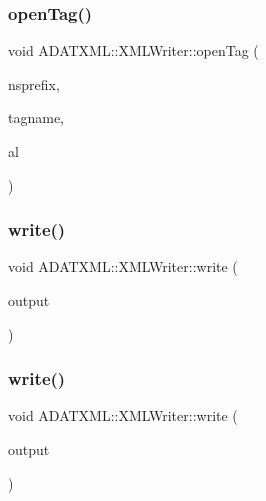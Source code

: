 \mbox{\label{classADATXML_1_1XMLWriter_a26795936be9ebee12c374fa82065ffb5}} 
\subsubsection{\texorpdfstring{openTag()}{openTag()}\hspace{0.1cm}{\footnotesize\ttfamily [8/8]}}
{\footnotesize\ttfamily void A\+D\+A\+T\+X\+M\+L\+::\+X\+M\+L\+Writer\+::open\+Tag (\begin{DoxyParamCaption}\item[{const std\+::string \&}]{nsprefix,  }\item[{const std\+::string \&}]{tagname,  }\item[{\mbox{\hyperlink{namespaceXMLWriterAPI_a28cf3d8051a4ccf0aef208b7ebc66d07}{X\+M\+L\+Writer\+A\+P\+I\+::\+Attribute\+List}} \&}]{al }\end{DoxyParamCaption})}

\mbox{\label{classADATXML_1_1XMLWriter_a82f1a99241ecd26ea2bd7f3d87364ed7}} 
\subsubsection{\texorpdfstring{write()}{write()}\hspace{0.1cm}{\footnotesize\ttfamily [1/20]}}
{\footnotesize\ttfamily void A\+D\+A\+T\+X\+M\+L\+::\+X\+M\+L\+Writer\+::write (\begin{DoxyParamCaption}\item[{const std\+::string \&}]{output }\end{DoxyParamCaption})}

\mbox{\label{classADATXML_1_1XMLWriter_a82f1a99241ecd26ea2bd7f3d87364ed7}} 
\subsubsection{\texorpdfstring{write()}{write()}\hspace{0.1cm}{\footnotesize\ttfamily [2/20]}}
{\footnotesize\ttfamily void A\+D\+A\+T\+X\+M\+L\+::\+X\+M\+L\+Writer\+::write (\begin{DoxyParamCaption}\item[{const std\+::string \&}]{output }\end{DoxyParamCaption})}

